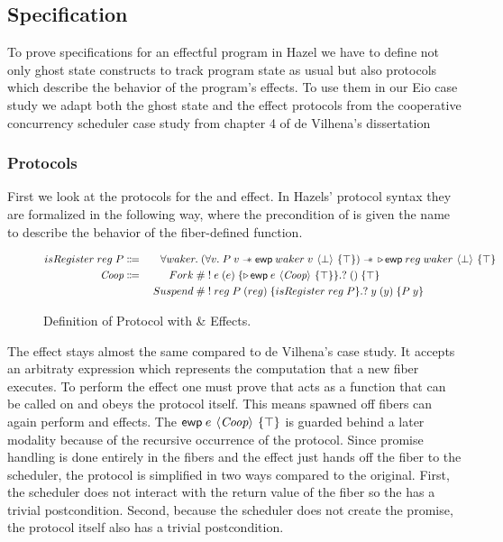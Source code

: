 \subsection{Specification}
\label{sec:sched-spec}

To prove specifications for an effectful program in Hazel we have to define not only ghost state constructs to track program state as usual but also protocols which describe the behavior of the program's effects.
To use them in our Eio case study we adapt both the ghost state and the effect protocols from the cooperative concurrency scheduler case study from chapter 4 of de Vilhena's dissertation~\cite{de2022proof}

\subsubsection{Protocols}
\label{sec:sched-spec-protocols}

First we look at the protocols for the \efork{} and \esuspend{} effect.
In Hazels' protocol syntax they are formalized in the following way, where the precondition of \esuspend{} is given the name \isreg{} to describe the behavior of the fiber-defined  function.

\begin{figure}[ht]
  \begin{alignat*}{2}
    isRegister\; reg\; P & \Coloneqq   & \forall waker.\; ( & \forall v.\;  P\; v \wand{} \ewp{waker\; v}{\bot}{\top}) \wand{} \later \ewp{reg\; waker}{\bot}{\top} \\
    \proto{}             & \Coloneqq\; & \quad Fork\; \#    & \; !\; e\; (e)\; \{\later \ewp{e}{\proto{}}{\top}\}. ?\; ()\; \{ \top \}                              \\
                         &             & Suspend\;    \#    & \; !\; reg\; P\; (reg)\; \{isRegister\; reg\; P\}.?\; y\; (y)\; \{ P\; y \}
  \end{alignat*}
  \caption{Definition of \proto{} Protocol with \efork{} \& \esuspend{} Effects.}
  \label{fig:coop-protocol-simpl}
\end{figure}

The \efork{} effect stays almost the same compared to de Vilhena's case study.
It accepts an arbitraty expression  which represents the computation that a new fiber executes.
To perform the effect one must prove that  acts as a function that can be called on \ocamlin{()} and obeys the  protocol itself.
This means spawned off fibers can again perform \efork{} and \esuspend{} effects.
The \(\ewp{e}{\proto{}}{\top}\) is guarded behind a later modality because of the recursive occurrence of the \proto{} protocol.
Since promise handling is done entirely in the fibers and the effect just hands off the fiber to the scheduler, the protocol is simplified in two ways compared to the original.
First, the scheduler does not interact with the return value of the fiber so the \ewpt{} has a trivial postcondition.
Second, because the scheduler does not create the promise, the protocol itself also has a trivial postcondition.

